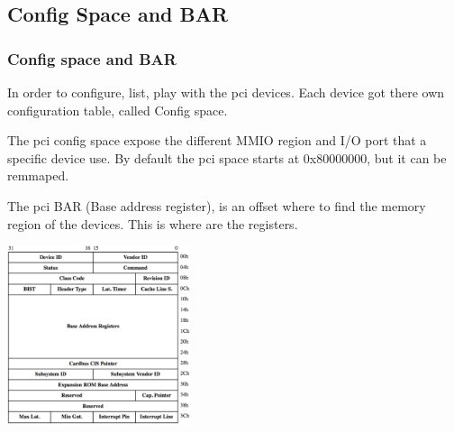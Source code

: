 \subsection{Config Space and BAR}
\begin{frame}
\frametitle{Config space and BAR}
In order to configure, list, play with the pci devices. Each device got
there own configuration table, called Config space.

\-

The pci config space expose the different MMIO region and I/O port that
a specific device use. By default the pci space starts at 0x80000000,
but it can be remmaped.

\-

The pci BAR (Base address register), is an offset where to find the
memory region of the devices. This is where are the registers.

\end{frame}

\begin{frame}
\begin{center}
\includegraphics[height=150pt]{pic/config_space}
\end{center}
\end{frame}

